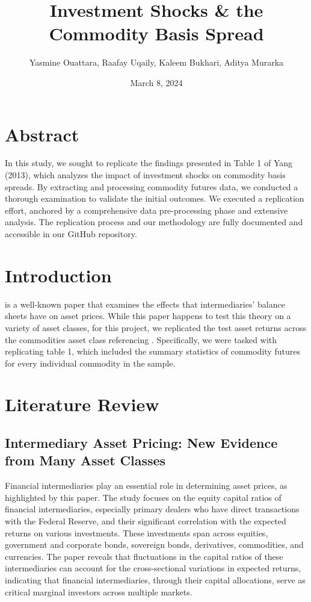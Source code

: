 \documentclass{article}
\title{Investment Shocks \& the Commodity Basis Spread}
\author{Yasmine Ouattara, Raafay Uqaily, Kaleem Bukhari, Aditya Murarka}
\date{March 8, 2024}
\begin{document}
\maketitle
\section{Abstract}

In this study, we sought to replicate the findings presented in Table 1 of Yang (2013), which analyzes the impact of investment shocks on commodity basis spreads. By extracting and processing commodity futures data, we conducted a thorough examination to validate the initial outcomes. We executed a replication effort, anchored by a comprehensive data pre-processing phase and extensive analysis. The replication process and our methodology are fully documented and accessible in our GitHub repository.

\section{Introduction}

\cite{ref1} is a well-known paper that examines the effects that intermediaries' balance sheets have on asset prices. While this paper happens to test this theory on a variety of asset classes, for this project, we replicated the test asset returns across the commodities asset class referencing \cite{ref2}. Specifically, we were tasked with replicating table 1, which included the summary statistics of commodity futures for every individual commodity in the sample.

\section{Literature Review}
\subsection{Intermediary Asset Pricing: New Evidence from Many Asset Classes}

Financial intermediaries play an essential role in determining asset prices, as highlighted by this paper. The study focuses on the equity capital ratios of financial intermediaries, especially primary dealers who have direct transactions with the Federal Reserve, and their significant correlation with the expected returns on various investments. These investments span across equities, government and corporate bonds, sovereign bonds, derivatives, commodities, and currencies. The paper reveals that fluctuations in the capital ratios of these intermediaries can account for the cross-sectional variations in expected returns, indicating that financial intermediaries, through their capital allocations, serve as critical marginal investors across multiple markets.
\end{document}
